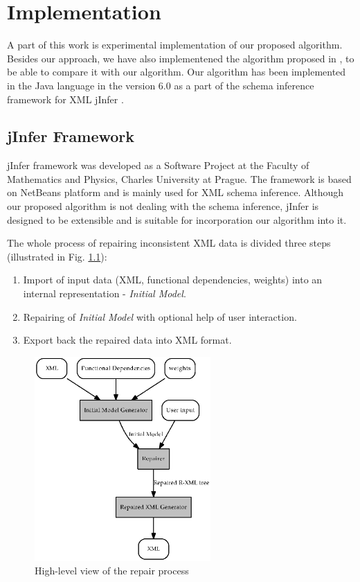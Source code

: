 \chapter{Implementation}

A part of this work is experimental implementation of our proposed algorithm. Besides our approach, we have also implementened the algorithm proposed in \cite{RepAndConsistentAnswer}, to be able to compare it with our algorithm. Our algorithm has been implemented in the Java language in the version 6.0 as a part of the schema inference framework for XML jInfer \cite{jinfer}.

\section{jInfer Framework}

jInfer framework was developed as a Software Project at the Faculty of Mathematics and Physics, Charles University at Prague. The framework is based on NetBeans platform and is mainly used for XML schema inference. Although our proposed algorithm is not dealing with the schema inference, jInfer is designed to be extensible and is suitable for incorporation our algorithm into it.

The whole process of repairing inconsistent XML data is divided three steps (illustrated in Fig. \ref{repairProcess}):

\begin{enumerate}
	\item Import of input data (XML, functional dependencies, weights) into an internal representation - \emph{Initial Model}.
    \item Repairing of \emph{Initial Model} with optional help of user interaction.
    \item Export back the repaired data into XML format.
\end{enumerate}

\begin{figure}[H]
    \centering\includegraphics[width=0.6\textwidth]{repair_process}
    \caption{High-level view of the repair process}
    \label{repairProcess}
\end{figure}


